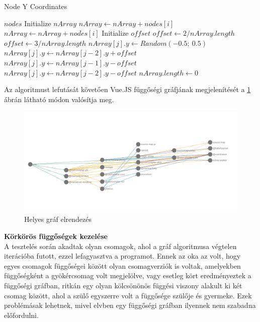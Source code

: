 \begin{algorithm}
	\caption{Node Y Coordinates}
	\begin{algorithmic}	
		\Require $nodes$
		\State Initialize $nArray$
				\State $nArray \gets nArray + nodes[i]$
				\State $nArray \gets nArray + nodes[i]$
				\State Initialize $offset$
					\State $offset \gets 2/nArray.length$
				\Else
					\State $offset \gets 3/nArray.length$
				\EndIf
						\State $nArray[j].y \gets Random(-0.5;\ 0.5)$
					\Else
						\State $nArray[j].y \gets nArray[j-2].y+offset$
						\Else
						\State $nArray[j].y \gets nArray[j-1].y-offset$
						\Else
						\State $nArray[j].y \gets nArray[j-2].y-offset$
						\EndIf
						\EndIf
					\EndIf
				\EndFor
				\State $nArray.length \gets 0$
			\EndIf
		\EndFor
	\end{algorithmic}
\end{algorithm}

\pagebreak

\noindent Az algoritmust lefutását követően Vue.JS függőségi gráfjának megjelenítését a \ref{fig:graph_right} ábrán látható módon valósítja meg.

\begin{figure}[!h]
	\centering
	\includegraphics[scale=0.4]{images/graph_right.png}
	\caption{Helyes gráf elrendezés}
	\label{fig:graph_right}
\end{figure}

\noindent\textbf{Körkörös függőségek kezelése}\\

A tesztelés során akadtak olyan csomagok, ahol a gráf algoritmusa végtelen iterációba futott, ezzel lefagyasztva a programot.
Ennek az oka az volt, hogy egyes csomagok függőségei között olyan csomagverziók is voltak, amelyekben függőségként a gyökércsomag volt megjelölve, vagy esetleg kört eredményeztek a függőségi gráfban, ritkán egy olyan kölcsönönös függési viszony alakult ki két csomag között, ahol a szülő egyszerre volt a függősége szülője és gyermeke. Ezek problémásak lehetnek, mivel elvben egy függőségi gráfban ilyennek nem szabadna előfordulni.

